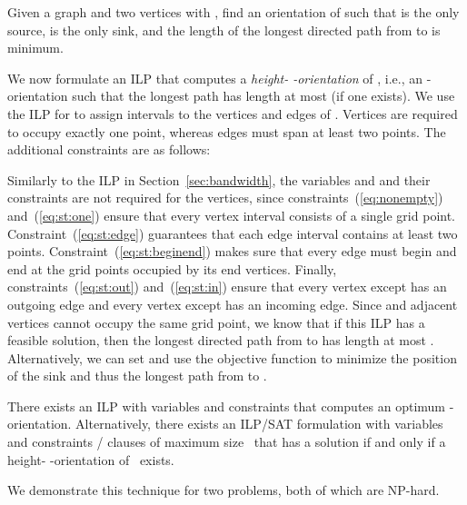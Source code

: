 \documentclass[runningheads]{llncs}
\newcounter{constr}
\begin{document}
\begin{problem}\label{pb:st}
	Given a graph  and two vertices  with , find an orientation of  such that  is the only source,  is the only sink, and the length of the longest directed path from  to  is minimum.
\end{problem}


We now formulate an ILP that computes a \emph{height-
-orientation} of , i.e., an -orientation such that the
longest path has length at most  (if one exists).
We use the ILP  for  to assign
intervals to the vertices and edges of . Vertices are required to
occupy exactly one point, whereas edges must span at least two points.
The additional constraints are as follows:

Similarly to the ILP in Section~\ref{sec:bandwidth}, the variables
 and  and their constraints are not required for the
vertices, since constraints~(\ref{eq:nonempty})
and~(\ref{eq:st:one}) ensure that every vertex interval consists of a
single grid point. Constraint~(\ref{eq:st:edge}) guarantees that each
edge interval contains at least two points.
Constraint~(\ref{eq:st:beginend}) makes sure that every edge must
begin and end at the grid points occupied by its end vertices.
Finally, constraints~(\ref{eq:st:out}) and~(\ref{eq:st:in}) ensure
that every vertex except  has an outgoing edge and every vertex
except  has an incoming edge. Since  and
adjacent vertices cannot occupy the same grid point, we know that if
this ILP has a feasible solution, then the longest directed path from
 to  has length at most . Alternatively, we can set  and
use the objective function  to
minimize the position of the sink  and thus the longest path from
 to .

\begin{theorem}
There exists an ILP with  variables
and constraints that computes an optimum -orientation. 
Alternatively, there exists an ILP/SAT formulation with 
variables and  constraints /  clauses of
maximum size~ that has a solution if and only if a height-
-orientation of~ exists. 
\end{theorem}



\iffalse


We demonstrate this technique for two problems, both of which are NP-hard.
\end{document}
